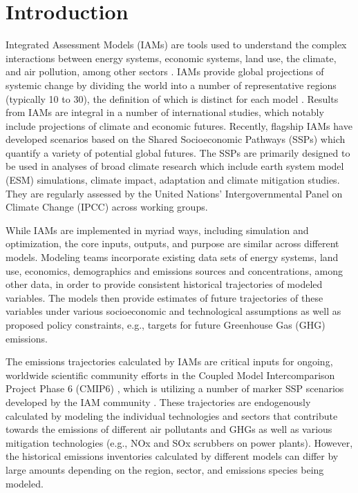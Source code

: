 \section{Introduction}

Integrated Assessment Models (IAMs) are tools used to understand the complex
interactions between energy systems, economic systems, land use, the climate,
and air pollution, among other sectors . IAMs provide global projections of
systemic change by dividing the world into a number of representative regions
(typically 10 to 30), the definition of which is distinct for each model
\cite{krey_global_2014}. Results from IAMs are integral in a number of
international studies, which notably include projections of climate and economic
futures. Recently, flagship IAMs have developed scenarios based on the Shared
Socioeconomic Pathways (SSPs) \cite{van_vuuren_energy_2017, fricko_marker_2017,
  fujimori_ssp3:_2017, calvin_ssp4:_2017, kriegler_fossil-fueled_2017} which
quantify a variety of potential global futures. The SSPs are primarily designed
to be used in analyses of broad climate research which include earth system
model (ESM) simulations, climate impact, adaptation and climate mitigation
studies. They are regularly assessed by the United Nations' Intergovernmental
Panel on Climate Change (IPCC) across working groups.

While IAMs are implemented in myriad ways, including simulation and
optimization, the core inputs, outputs, and purpose are similar across different
models. Modeling teams incorporate existing data sets of energy systems, land
use, economics, demographics and emissions sources and concentrations, among other
data, in order to provide consistent historical trajectories of modeled
variables. The models then provide estimates of future trajectories of these
variables under various socioeconomic and technological assumptions as well as
proposed policy constraints, e.g., targets for future Greenhouse Gas (GHG)
emissions.

The emissions trajectories calculated by IAMs are critical inputs for ongoing,
worldwide scientific community efforts in the Coupled Model Intercomparison
Project Phase 6 (CMIP6) \cite{eyring_overview_2016}, which is utilizing a number
of marker SSP scenarios developed by the IAM community
\cite{oneill_scenario_2016}. These trajectories are endogenously calculated by
modeling the individual technologies and sectors that contribute towards the
emissions of different air pollutants and GHGs as well as various mitigation
technologies (e.g., NOx and SOx scrubbers on power plants). However, the
historical emissions inventories calculated by different models can differ by
large amounts depending on the region, sector, and emissions species being
modeled.

